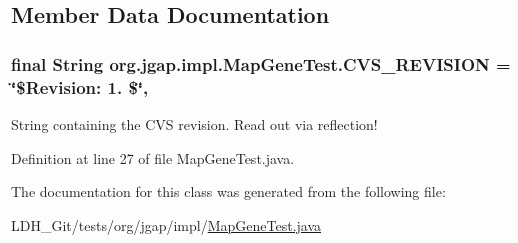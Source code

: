 \subsection{Member Data Documentation}
\hypertarget{classorg_1_1jgap_1_1impl_1_1_map_gene_test_a71c626eecac268907be7bf527a95c4cd}{
\subsubsection[{C\-V\-S\-\_\-\-R\-E\-V\-I\-S\-I\-O\-N}]{\setlength{\rightskip}{0pt plus 5cm}final String org.\-jgap.\-impl.\-Map\-Gene\-Test.\-C\-V\-S\-\_\-\-R\-E\-V\-I\-S\-I\-O\-N = \char`\"{}\$Revision\-: 1. \$\char`\"{}\hspace{0.3cm}{\ttfamily [static]}, {\ttfamily [private]}}}\label{classorg_1_1jgap_1_1impl_1_1_map_gene_test_a71c626eecac268907be7bf527a95c4cd}
String containing the C\-V\-S revision. Read out via reflection! 

Definition at line 27 of file Map\-Gene\-Test.\-java.



The documentation for this class was generated from the following file\-:\begin{DoxyCompactItemize}
\item 
L\-D\-H\-\_\-\-Git/tests/org/jgap/impl/\hyperlink{_map_gene_test_8java}{Map\-Gene\-Test.\-java}\end{DoxyCompactItemize}
